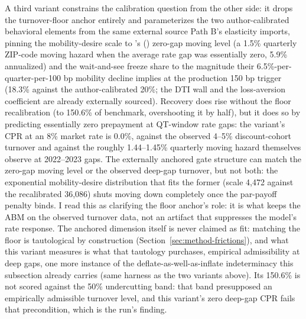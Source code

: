\documentclass[12pt]{article}
\newcommand{\citepos}[1]{\citeauthor{#1}'s (\citeyear{#1})}
\begin{document}
A third variant constrains the calibration question from the other side: it drops the turnover-floor anchor entirely and parameterizes the two author-calibrated behavioral elements from the same external source Path B's elasticity imports, pinning the mobility-desire scale to \citepos{liebersohn2024} zero-gap moving level (a 1.5\% quarterly ZIP-code moving hazard when the average rate gap was essentially zero, 5.9\% annualized) and the wait-and-see freeze share to the magnitude their 6.5\%-per-quarter-per-100 bp mobility decline implies at the production 150 bp trigger (18.3\% against the author-calibrated 20\%; the DTI wall and the loss-aversion coefficient are already externally sourced). Recovery does rise without the floor recalibration (to 150.6\% of benchmark, overshooting it by half), but it does so by predicting essentially zero prepayment at QT-window rate gaps: the variant's CPR at an 8\% market rate is 0.0\%, against the observed 4--5\% discount-cohort turnover and against the roughly 1.44--1.45\% quarterly moving hazard \citet{liebersohn2024} themselves observe at 2022--2023 gaps. The externally anchored gate structure can match the zero-gap moving level or the observed deep-gap turnover, but not both: the exponential mobility-desire distribution that fits the former (scale 4{,}472 against the recalibrated 36{,}086) shuts moving down completely once the par-payoff penalty binds. I read this as clarifying the floor anchor's role: it is what keeps the ABM on the observed turnover data, not an artifact that suppresses the model's rate response. The anchored dimension itself is never claimed as fit: matching the floor is tautological by construction (Section~\ref{sec:method-frictions}), and what this variant measures is what that tautology purchases, empirical admissibility at deep gaps, one more instance of the deflate-as-well-as-inflate indeterminacy this subsection already carries (same harness as the two variants above). Its 150.6\% is not scored against the 50\% undercutting band: that band presupposed an empirically admissible turnover level, and this variant's zero deep-gap CPR fails that precondition, which is the run's finding.
\end{document}
